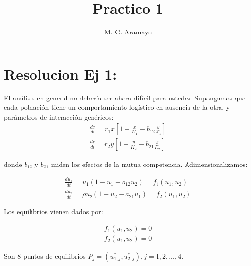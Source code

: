\documentclass[twocolumn,aps,prl]{revtex4-1}
\begin{document}

\title{Practico 1}
\author{M. G. Aramayo}


\maketitle



\section{Resolucion Ej 1:}

El análisis en general no debería ser ahora difícil para ustedes. Supongamos que cada población tiene un comportamiento logístico en ausencia de la otra, y parámetros de interacción genéricos:
$$
\begin{aligned}
\frac{d x}{d t}=r_{1} x\left[1-\frac{x}{K_{1}}-b_{12} \frac{y}{K_{1}}\right] \\
\frac{d y}{d t}=r_{2} y\left[1-\frac{y}{K_{2}}-b_{21} \frac{x}{K_{2}}\right]
\end{aligned}
$$

donde $b_{12}$ y $b_{21}$ miden los efectos de la mutua competencia. Adimensionalizamos:

$$
\begin{aligned}
\frac{d u_{1}}{d t}=u_{1}\left(1-u_{1}-a_{12} u_{2}\right)=f_{1}\left(u_{1}, u_{2}\right) \\
\frac{d u_{2}}{d t}=\rho u_{2}\left(1-u_{2}-a_{21} u_{1}\right)=f_{2}\left(u_{1}, u_{2}\right)
\end{aligned}
$$

Los equilibrios vienen dados por:

$$
\begin{aligned}
    f_1(u_1, u_2) = 0\\ 
    f_2(u_1, u_2) = 0
\end{aligned}
$$

Son 8 puntos de equilibrios $P_j = (u^*_{1,j},u^*_{2,j}), j= 1, 2, ..., 4$.
\end{document}
